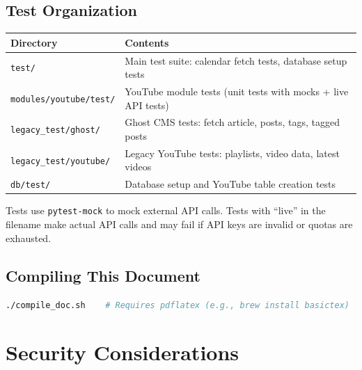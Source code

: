 \documentclass[12pt]{article}
\begin{document}
\subsection{Test Organization}

\begin{longtable}{lp{8cm}}
\toprule
\textbf{Directory} & \textbf{Contents} \\
\midrule
\texttt{test/} & Main test suite: calendar fetch tests, database setup tests \\
\texttt{modules/youtube/test/} & YouTube module tests (unit tests with mocks + live API tests) \\
\texttt{legacy\_test/ghost/} & Ghost CMS tests: fetch article, posts, tags, tagged posts \\
\texttt{legacy\_test/youtube/} & Legacy YouTube tests: playlists, video data, latest videos \\
\texttt{db/test/} & Database setup and YouTube table creation tests \\
\bottomrule
\end{longtable}

Tests use \texttt{pytest-mock} to mock external API calls. Tests with ``live'' in the filename make actual API calls and may fail if API keys are invalid or quotas are exhausted.

\subsection{Compiling This Document}
\begin{lstlisting}[language=bash, basicstyle=\ttfamily\footnotesize, frame=none, numbers=none]
./compile_doc.sh    # Requires pdflatex (e.g., brew install basictex)
\end{lstlisting}

\section{Security Considerations}
\label{sec:security}
\end{document}
